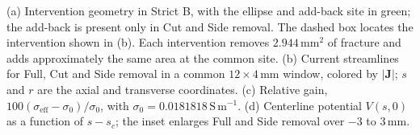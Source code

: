 (a) Intervention geometry in Strict B, with the ellipse and add-back site in green; the add-back is present only in Cut and Side removal. The dashed box locates the intervention shown in (b). Each intervention removes $2.944\,\mathrm{mm}^2$ of fracture and adds approximately the same area at the common site. (b) Current streamlines for Full, Cut and Side removal in a common $12\times4\,\mathrm{mm}$ window, colored by $|\mathbf{J}|$; $s$ and $r$ are the axial and transverse coordinates. (c) Relative gain, $100(\sigma_{\mathrm{eff}}-\sigma_0)/\sigma_0$, with $\sigma_0=0.0181818\,\mathrm{S\,m^{-1}}$. (d) Centerline potential $V(s,0)$ as a function of $s-s_c$; the inset enlarges Full and Side removal over $-3$ to $3\,\mathrm{mm}$.
